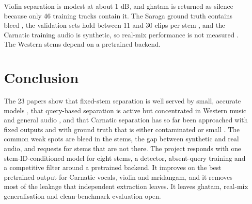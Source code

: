 \documentclass[12pt,a4paper]{article}
\begin{document}
Violin separation is modest at about 1 dB, and ghatam is returned as silence because only 46 training tracks contain it. The Saraga ground truth contains bleed \cite{sanidha}, the validation sets hold between 11 and 30 clips per stem \cite{perceptual}, and the Carnatic training audio is synthetic, so real-mix performance is not measured \cite{ensembles}. The Western stems depend on a pretrained backend.

\section{Conclusion}

The 23 papers show that fixed-stem separation is well served by small, accurate models \cite{scnet,moiseslight}, that query-based separation is active but concentrated in Western music and general audio \cite{banquet,hyperell,qscnet,clapsep,pmq}, and that Carnatic separation has so far been approached with fixed outputs and with ground truth that is either contaminated or small \cite{carnaticft,sanidha,ssn}. The common weak spots are bleed in the stems, the gap between synthetic and real audio, and requests for stems that are not there. The project responds with one stem-ID-conditioned model for eight stems, a detector, absent-query training and a competitive filter around a pretrained backend. It improves on the best pretrained output for Carnatic vocals, violin and mridangam, and it removes most of the leakage that independent extraction leaves. It leaves ghatam, real-mix generalisation and clean-benchmark evaluation open.
\end{document}

